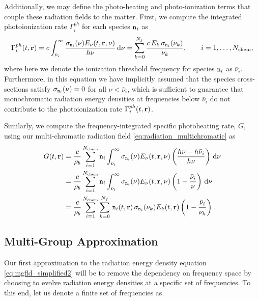 \documentclass[10pt]{article}
\renewcommand{\(}{\left(}
\renewcommand{\)}{\right)}
\newcommand{\rvec}{{\bf r}}
\newcommand{\rhob}{\rho_b}
\newcommand{\Enu}{E_{\nu}}
\newcommand{\mn}{{\tt n}}
\begin{document}
Additionally, we may define the photo-heating and photo-ionization
terms that couple these radiation fields to the matter.  
First, we compute the integrated photoionization rate $\Gamma_i^{ph}$
for each species $\mn_i$ as
\begin{equation}
\label{eq:multichromatic_photoionization}
   \Gamma_i^{ph}(t,\rvec)  = 
   c \int_{\bar{\nu}_i}^{\infty} \frac{\sigma_{\mn_i}(\nu)\Enu(t,\rvec,\nu)}{h\nu}\,\mathrm d\nu =  
   \sum_{k=0}^{N_f} \frac{c\, E_k\, \sigma_{\mn_i}(\nu_k)}{\nu_k}, \qquad i=1,\ldots,N_\text{chem},
\end{equation}
where here we denote the ionization threshold frequency for species
$\mn_i$ as $\bar{\nu}_i$.  Furthermore, in this equation we have
implicitly assumed that the species cross-sections satisfy
$\sigma_{\mn_i}(\nu) = 0$ for all $\nu < \bar{\nu}_i$, which is
sufficient to guarantee that monochromatic radiation energy densities
at frequencies below $\bar{\nu}_i$ do not contribute to the
photoionization rate $\Gamma_i^{ph}(t,\rvec)$. 

Similarly, we compute the frequency-integrated specific photoheating
rate, $G$, using our multi-chromatic radiation field
\eqref{eq:radiation_multichromatic} as 
\begin{align}
\notag
   G(t,\rvec) &= 
   \frac{c}{\rhob} \sum_{i=1}^{N_\text{chem}} \mn_i
     \int_{\bar{\nu}_i}^{\infty} \sigma_{\mn_i}(\nu) \Enu(t,\rvec,\nu)
     \left(\frac{h\nu - h\bar{\nu}_i}{h\nu}\right)\,\mathrm d\nu \\
\label{eq:multichromatic_photoheating}
   &= 
   \frac{c}{\rhob} \sum_{i=1}^{N_\text{chem}} \mn_i
     \int_{\bar{\nu}_i}^{\infty} \sigma_{\mn_i}(\nu) \Enu(t,\rvec,\nu)
     \left(1 - \frac{\bar{\nu}_i}{\nu}\right)\,\mathrm d\nu \\
\notag
   &= 
   \frac{c}{\rhob} \sum_{i=1}^{N_\text{chem}} \sum_{k=0}^{N_f}\, \mn_i(t,\rvec)\,
     \sigma_{\mn_i}(\nu_k) E_k(t,\rvec) \left(1 - \frac{\bar{\nu}_i}{\nu_k}\right).
\end{align}




\subsection{Multi-Group Approximation}
\label{subsec:multi_group}

Our first approximation to the radiation energy density equation
\eqref{eq:mgfld_simplified2} will be to remove the dependency on
frequency space by choosing to evolve radiation energy densities at a
specific set of frequencies.  To this end, let us denote a finite set
of frequencies as
\end{document}
